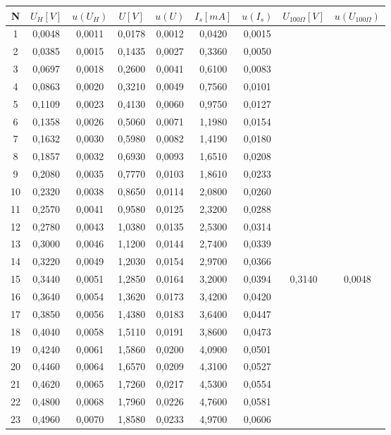 \documentclass[10pt,a4paper]{article}
\begin{document}
\hfill
\begin{tabular}{c|c|c|c|c|c|c|c|c}
N	&	$U_H [V]$	&	$u(U_H)$	&	$U[V]$	&	$u(U)$	&	 $I_s[mA]$	&	$u(I_s)$	&	 $U_{100\Omega}[V]$	&	$u(U_{100\Omega})$	 \\\hline
1	&	0,0048	&	0,0011	&	0,0178	&	0,0012	&	0,0420	&	0,0015	&		&		 \\
2	&	0,0385	&	0,0015	&	0,1435	&	0,0027	&	0,3360	&	0,0050	&		&		 \\
3	&	0,0697	&	0,0018	&	0,2600	&	0,0041	&	0,6100	&	0,0083	&		&		 \\
4	&	0,0863	&	0,0020	&	0,3210	&	0,0049	&	0,7560	&	0,0101	&		&		 \\
5	&	0,1109	&	0,0023	&	0,4130	&	0,0060	&	0,9750	&	0,0127	&		&		 \\
6	&	0,1358	&	0,0026	&	0,5060	&	0,0071	&	1,1980	&	0,0154	&		&		 \\
7	&	0,1632	&	0,0030	&	0,5980	&	0,0082	&	1,4190	&	0,0180	&		&		 \\
8	&	0,1857	&	0,0032	&	0,6930	&	0,0093	&	1,6510	&	0,0208	&		&		 \\
9	&	0,2080	&	0,0035	&	0,7770	&	0,0103	&	1,8610	&	0,0233	&		&		 \\
10	&	0,2320	&	0,0038	&	0,8650	&	0,0114	&	2,0800	&	0,0260	&		&		 \\
11	&	0,2570	&	0,0041	&	0,9580	&	0,0125	&	2,3200	&	0,0288	&		&		 \\
12	&	0,2780	&	0,0043	&	1,0380	&	0,0135	&	2,5300	&	0,0314	&		&		 \\
13	&	0,3000	&	0,0046	&	1,1200	&	0,0144	&	2,7400	&	0,0339	&		&		 \\
14	&	0,3220	&	0,0049	&	1,2030	&	0,0154	&	2,9700	&	0,0366	&		&		 \\
15	&	0,3440	&	0,0051	&	1,2850	&	0,0164	&	3,2000	&	0,0394	&	0,3140	&	0,0048	\\
16	&	0,3640	&	0,0054	&	1,3620	&	0,0173	&	3,4200	&	0,0420	&		&		 \\
17	&	0,3850	&	0,0056	&	1,4380	&	0,0183	&	3,6400	&	0,0447	&		&		 \\
18	&	0,4040	&	0,0058	&	1,5110	&	0,0191	&	3,8600	&	0,0473	&		&		 \\
19	&	0,4240	&	0,0061	&	1,5860	&	0,0200	&	4,0900	&	0,0501	&		&		 \\
20	&	0,4460	&	0,0064	&	1,6570	&	0,0209	&	4,3100	&	0,0527	&		&		 \\
21	&	0,4620	&	0,0065	&	1,7260	&	0,0217	&	4,5300	&	0,0554	&		&		 \\
22	&	0,4800	&	0,0068	&	1,7960	&	0,0226	&	4,7600	&	0,0581	&		&		 \\
23	&	0,4960	&	0,0070	&	1,8580	&	0,0233	&	4,9700	&	0,0606	&		&		 \\

\end{tabular}
\end{document}
